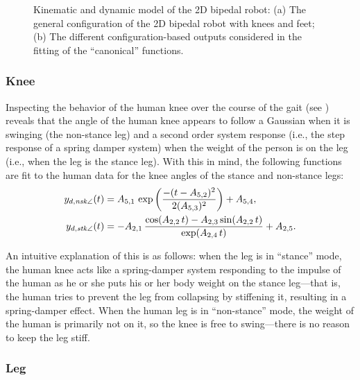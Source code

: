 \begin{figure}[t!]
  \centering
  \hspace{.2cm}
  \caption[Kinematic and dynamic model of the 2D bipedal robot.]{Kinematic and
    dynamic model of the 2D bipedal robot:
    (a) The general configuration of the 2D bipedal robot with knees and feet;
    (b) The different configuration-based outputs considered in the fitting of
    the ``canonical'' functions.}
  \label{fig:robotconstraints}
\end{figure}


\subsubsection{Knee}

Inspecting the behavior of the human knee over the course of the gait (see
) reveals that the angle of the human knee appears
to follow a Gaussian when it is swinging (the non-stance leg) and a second order
system response (i.e., the step response of a spring damper system) when the
weight of the person is on the leg (i.e., when the leg is the stance leg).
%
With this in mind, the following functions are fit to the human data for the
knee angles of the stance and non-stance legs:
%
\begin{align*}
  y_{d,\mathit{nsk}\angle}(t) &= A_{5,1} \, \exp\left(\frac{-(t-A_{5,2})^2}{2
      (A_{5,3})^2}\right) + A_{5,4},\\
  y_{d,\mathit{stk}\angle}(t) &= -A_{2,1} \, \frac{\cos(A_{2,2}\,t)-A_{2,3}
    \sin(A_{2,2}\,t)}{\exp(A_{2,4} \, t)} + A_{2,5}. 
\end{align*}
%

An intuitive explanation of this is as follows:
%
when the leg is in ``stance'' mode, the human knee acts like a spring-damper
system responding to the impulse of the human as he or she puts his or her body
weight on the stance leg---that is, the human tries to prevent the leg from
collapsing by stiffening it, resulting in a spring-damper effect.
%
When the human leg is in ``non-stance'' mode, the weight of the human is
primarily not on it, so the knee is free to swing---there is no reason to keep
the leg stiff.


\subsubsection{Leg}

